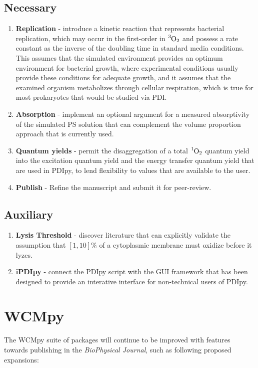 \subsection{Necessary}
\begin{enumerate}
    \item \textbf{Replication} - introduce a kinetic reaction that represents bacterial replication, which may occur in the first-order in $\ce{^3O2}$ and possess a rate constant as the inverse of the doubling time in standard media conditions. This assumes that the simulated environment provides an optimum environment for bacterial growth, where experimental conditions usually provide these conditions for adequate growth, and it assumes that the examined organism metabolizes through cellular respiration, which is true for most prokaryotes that would be studied via PDI.
    \item \textbf{Absorption} - implement an optional argument for a measured absorptivity of the simulated PS solution that can complement the volume proportion approach that is currently used.
    \item \textbf{Quantum yields} - permit the disaggregation of a total $\ce{^1O2}$ quantum yield into the excitation quantum yield and the energy transfer quantum yield that are used in PDIpy, to lend flexibility to values that are available to the user.
    \item \textbf{Publish} - Refine the manuscript and submit it for peer-review.
\end{enumerate}

\subsection{Auxiliary}
\begin{enumerate}
    \item \textbf{Lysis Threshold} - discover literature that can explicitly validate the assumption that $[1,10]\%$ of a cytoplasmic membrane must oxidize before it lyzes.
    \item \textbf{iPDIpy} - connect the PDIpy script with the GUI framework that has been designed to provide an interative interface for non-technical users of PDIpy.
\end{enumerate}

\section{WCMpy}
The WCMpy suite of packages will continue to be improved with features towards publishing in the \textit{BioPhysical Journal}, such as following proposed expansions:
